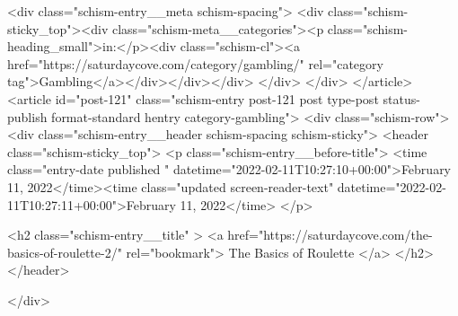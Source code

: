 {		<div class="schism-entry__meta schism-spacing">			<div class="schism-sticky_top"><div class="schism-meta__categories"><p class="schism-heading_small">in:</p><div class="schism-cl"><a href="https://saturdaycove.com/category/gambling/" rel="category tag">Gambling</a></div></div></div>		</div>
	</div>
</article>
<article id="post-121" class="schism-entry post-121 post type-post status-publish format-standard hentry category-gambling">
	<div class="schism-row">		<div class="schism-entry__header schism-spacing schism-sticky">			<header class="schism-sticky_top">				<p class="schism-entry__before-title">
					<time class="entry-date published " datetime="2022-02-11T10:27:10+00:00">February 11, 2022</time><time class="updated screen-reader-text" datetime="2022-02-11T10:27:11+00:00">February 11, 2022</time>				</p>

				<h2 class="schism-entry__title" >
					<a href="https://saturdaycove.com/the-basics-of-roulette-2/" rel="bookmark">
						The Basics of Roulette					</a>
				</h2>
			</header>

					</div>

}
